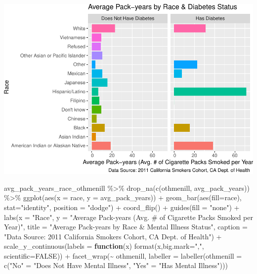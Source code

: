 \documentclass[
]{article}
\newenvironment{Shaded}{\begin{snugshade}}{\end{snugshade}}
\newcommand{\AttributeTok}[1]{\textcolor[rgb]{0.77,0.63,0.00}{#1}}
\newcommand{\ConstantTok}[1]{\textcolor[rgb]{0.00,0.00,0.00}{#1}}
\newcommand{\ControlFlowTok}[1]{\textcolor[rgb]{0.13,0.29,0.53}{\textbf{#1}}}
\newcommand{\FunctionTok}[1]{\textcolor[rgb]{0.00,0.00,0.00}{#1}}
\newcommand{\NormalTok}[1]{#1}
\newcommand{\OtherTok}[1]{\textcolor[rgb]{0.56,0.35,0.01}{#1}}
\newcommand{\SpecialCharTok}[1]{\textcolor[rgb]{0.00,0.00,0.00}{#1}}
\newcommand{\StringTok}[1]{\textcolor[rgb]{0.31,0.60,0.02}{#1}}
\begin{document}
\includegraphics{Milestone_4_files/figure-latex/bar graph of cigarette pack-years by race and diabetes-1.pdf}
\newpage

\begin{Shaded}
\begin{Highlighting}[]
\NormalTok{avg\_pack\_years\_race\_othmenill }\SpecialCharTok{\%\textgreater{}\%}
  \FunctionTok{drop\_na}\NormalTok{(}\FunctionTok{c}\NormalTok{(othmenill, avg\_pack\_years)) }\SpecialCharTok{\%\textgreater{}\%}
  \FunctionTok{ggplot}\NormalTok{(}\FunctionTok{aes}\NormalTok{(}\AttributeTok{x =}\NormalTok{ race, }\AttributeTok{y =}\NormalTok{ avg\_pack\_years)) }\SpecialCharTok{+}
  \FunctionTok{geom\_bar}\NormalTok{(}\FunctionTok{aes}\NormalTok{(}\AttributeTok{fill=}\NormalTok{race), }\AttributeTok{stat=}\StringTok{"identity"}\NormalTok{, }\AttributeTok{position =} \StringTok{"dodge"}\NormalTok{) }\SpecialCharTok{+}
  \FunctionTok{coord\_flip}\NormalTok{() }\SpecialCharTok{+}
  \FunctionTok{guides}\NormalTok{(}\AttributeTok{fill =} \StringTok{"none"}\NormalTok{) }\SpecialCharTok{+}
  \FunctionTok{labs}\NormalTok{(}\AttributeTok{x =} \StringTok{"Race"}\NormalTok{,}
       \AttributeTok{y =} \StringTok{"Average Pack{-}years (Avg. \# of Cigarette Packs Smoked per Year)"}\NormalTok{,}
  \AttributeTok{title =} \StringTok{"Average Pack{-}years by Race \& Mental Illness Status"}\NormalTok{,}
  \AttributeTok{caption =} \StringTok{"Data Source: 2011 California Smokers Cohort, CA Dept. of Health"}\NormalTok{) }\SpecialCharTok{+}
  \FunctionTok{scale\_y\_continuous}\NormalTok{(}\AttributeTok{labels =} \ControlFlowTok{function}\NormalTok{(x) }\FunctionTok{format}\NormalTok{(x,}\AttributeTok{big.mark=}\StringTok{","}\NormalTok{,}
                                                     \AttributeTok{scientific=}\ConstantTok{FALSE}\NormalTok{)) }\SpecialCharTok{+}
  \FunctionTok{facet\_wrap}\NormalTok{(}\SpecialCharTok{\textasciitilde{}}\NormalTok{ othmenill, }\AttributeTok{labeller =} \FunctionTok{labeller}\NormalTok{(}\AttributeTok{othmenill =}
                                      \FunctionTok{c}\NormalTok{(}\StringTok{"No"} \OtherTok{=} \StringTok{"Does Not Have Mental Illness"}\NormalTok{,}
                                        \StringTok{"Yes"} \OtherTok{=} \StringTok{"Has Mental Illness"}\NormalTok{)))}
\end{Highlighting}
\end{Shaded}
\end{document}
